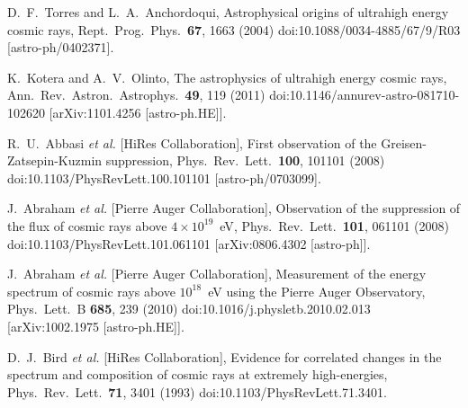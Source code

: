 \documentclass[aps,prd,twocolumn,superscriptaddress,tightenlines,nofootinbib]{revtex4-1}
\begin{document}
\begin{thebibliography}{99}



  D.~F.~Torres and L.~A.~Anchordoqui,
  {\color{rossoCP3} Astrophysical origins of ultrahigh energy cosmic rays},
  Rept.\ Prog.\ Phys.\  {\bf 67}, 1663 (2004)
  doi:10.1088/0034-4885/67/9/R03
  [astro-ph/0402371].





  K.~Kotera and A.~V.~Olinto,
  {\color{rossoCP3} The astrophysics of ultrahigh energy cosmic rays},
  Ann.\ Rev.\ Astron.\ Astrophys.\  {\bf 49}, 119 (2011)
  doi:10.1146/annurev-astro-081710-102620
  [arXiv:1101.4256 [astro-ph.HE]].


  R.~U.~Abbasi {\it et al.} [HiRes Collaboration],
  {\color{rossoCP3} First observation of the Greisen-Zatsepin-Kuzmin suppression},
  Phys.\ Rev.\ Lett.\  {\bf 100}, 101101 (2008)
  doi:10.1103/PhysRevLett.100.101101
  [astro-ph/0703099].


  J.~Abraham {\it et al.} [Pierre Auger Collaboration],
  {\color{rossoCP3} Observation of the suppression of the flux of cosmic rays above $4\times 10^{19}$~eV},
  Phys.\ Rev.\ Lett.\  {\bf 101}, 061101 (2008)
  doi:10.1103/PhysRevLett.101.061101
  [arXiv:0806.4302 [astro-ph]].


  J.~Abraham {\it et al.} [Pierre Auger Collaboration],
  {\color{rossoCP3} Measurement of the energy spectrum of cosmic rays above $10^{18}$~eV using the Pierre Auger Observatory},
  Phys.\ Lett.\ B {\bf 685}, 239 (2010)
  doi:10.1016/j.physletb.2010.02.013
  [arXiv:1002.1975 [astro-ph.HE]].


  D.~J.~Bird {\it et al.} [HiRes Collaboration],
  {\color{rossoCP3} Evidence for correlated changes in the spectrum and composition of cosmic rays at extremely high-energies},
  Phys.\ Rev.\ Lett.\  {\bf 71}, 3401 (1993)
  doi:10.1103/PhysRevLett.71.3401.


\end{thebibliography}
\end{document}
